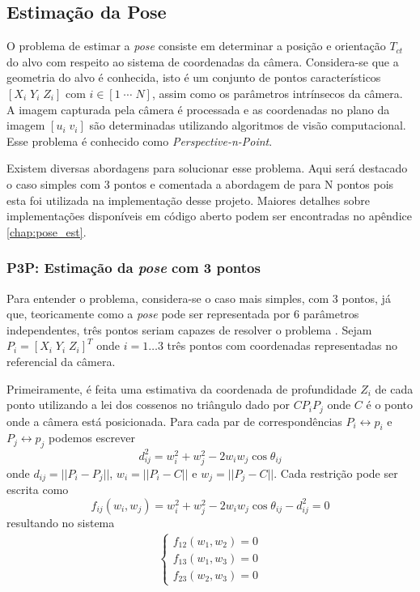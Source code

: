 \subsection{Estimação da Pose}
O problema de estimar a \textit{pose} consiste em determinar a posição e orientação ${T}_{ct}$ do alvo com respeito ao sistema de coordenadas da câmera. Considera-se que a geometria do alvo é conhecida, isto é um conjunto de pontos característicos $[X_i \; Y_i \; Z_i]$ com $i \in [1\; \cdots \; N]$, assim como os parâmetros intrínsecos da câmera. A imagem capturada pela câmera é processada e as coordenadas no plano da imagem $[u_i\; v_i]$ são determinadas utilizando algoritmos de visão computacional. Esse problema é conhecido como \textit{Perspective-n-Point}.

Existem diversas abordagens para solucionar esse problema. Aqui será destacado o caso simples com 3 pontos e comentada a abordagem de \citep{dementhon1995model}  para N pontos pois esta foi utilizada na implementação desse projeto. Maiores detalhes sobre implementações disponíveis em código aberto podem ser encontradas no apêndice \ref{chap:pose_est}. 

\subsubsection{P3P: Estimação da \textit{pose} com 3 pontos}
Para entender o problema, considera-se o caso mais simples, com 3 pontos, já que, teoricamente como a \textit{pose} pode ser representada por 6 parâmetros independentes, três pontos seriam capazes de resolver o problema \citep{marchand2016pose}. Sejam ${P_i} = [X_i \; Y_i \; Z_i ]^T$ onde $i = 1 \dots 3$ três pontos com coordenadas representadas no referencial da câmera. 

Primeiramente, é feita uma estimativa da coordenada de profundidade $Z_i$ de cada ponto utilizando a lei dos cossenos no triângulo dado por ${C} {P}_i {P}_j$ onde ${C}$ é o ponto onde a câmera está posicionada. Para cada par de correspondências $P_i \leftrightarrow p_i$ e $P_j \leftrightarrow p_j$ podemos escrever \citep{quan1999linear} 
\begin{equation}
d_{ij}^2 = w_i^2 + w_j^2 -2 w_i w_j \cos \theta_{ij}
\end{equation}
onde $d_{ij} = ||{P}_i - {P}_j||$, $w_i = ||{P}_i - C||$ e $w_j = ||{P}_j - {C}||$. Cada restrição pode ser escrita como 
\begin{equation}
f_{ij}(w_i, w_j) = w_i^2 + w_j^2 - 2w_i w_j \cos \theta_{ij} - d_{ij}^2 = 0
\end{equation}
resultando no sistema
\begin{align*}
\begin{cases}
f_{12}(w_1, w_2) = 0 \\ 
f_{13}(w_1, w_3) = 0 \\ 
f_{23}(w_2, w_3) = 0
\end{cases}
\end{align*}

